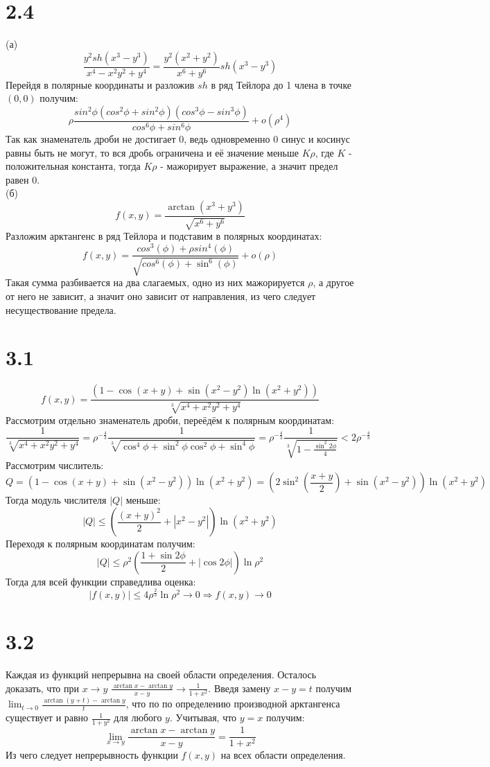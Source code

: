 \documentclass[12pt]{article}
\begin{document}
\section{2.4}
(а) 
$$\frac{y^2sh(x^3 - y^3)}{x^4 - x^2y^2 + y^4} = \frac{y^2(x^2 + y^2)}{x^6 + y^6} sh(x^3 - y^3)$$
Перейдя в полярные координаты и разложив $sh$ в ряд Тейлора до 1 члена в точке $(0, 0)$ получим:
$$
\rho \frac{sin^2{\phi}(cos^2{\phi} + sin^2{\phi})(cos^3{\phi} - sin^3{\phi})}{cos^6{\phi} + sin^6{\phi}} + o(\rho^4)
$$
Так как знаменатель дроби не достигает $0$, ведь одновременно $0$ синус и косинус равны быть не могут, то вся дробь ограничена и её значение меньше $K\rho$, 
где $K$ - положительная константа, тогда $K\rho$ - мажорирует выражение, а значит предел равен $0$.
\\(б)
$$f(x, y) = \frac{\arctan(x^3 + y^3)}{\sqrt{x^6 + y^6}}$$
Разложим арктангенс в ряд Тейлора и подставим в полярных координатах:
$$f(x, y) = \frac{cos^3(\phi) + \rho sin^4(\phi)}{\sqrt{cos^6(\phi) + \sin^6(\phi)}} + o(\rho)$$
Такая сумма разбивается на два слагаемых, одно из них мажорируется $\rho$, а другое от него не зависит, а значит оно зависит от направления, из чего следует несуществование предела.

\section{3.1}
$$f(x, y) = \frac{(1 - \cos(x+y) + \sin(x^2 - y^2)\ln(x^2 + y^2))}{\sqrt[3]{x^4 + x^2y^2 + y^4}}$$
Рассмотрим отдельно знаменатель дроби, переёдём к полярным координатам:
$$\frac{1}{\sqrt[3]{x^4 + x^2y^2 + y^4}} = 
\rho^{-\frac{4}{3}}\frac{1}{\sqrt[3]{\cos^4{\phi} + \sin^2{\phi}\cos^2{\phi} + \sin^4{\phi}}} = 
\rho^{-\frac{4}{3}}\frac{1}{\sqrt[3]{1 - \frac{\sin^2{2\phi}}{4}}} < 2\rho^{-\frac{4}{3}}$$
Рассмотрим числитель:
$$Q = (1 - \cos(x+y) + \sin(x^2 - y^2))\ln(x^2 + y^2) = 
(2\sin^2\left(\frac{x+y}{2}\right) + \sin(x^2 - y^2))\ln(x^2 + y^2)
$$
Тогда модуль числителя $|Q|$ меньше:
$$
|Q| \leq \left(\frac{(x+y)^2}{2} + |x^2 - y^2|\right)\ln(x^2 + y^2)
$$
Переходя к полярным координатам получим:
$$
|Q| \leq \rho^2\left(\frac{1 + \sin{2\phi}}{2} + |\cos{2\phi}|\right)\ln{\rho^2}
$$
Тогда для всей функции справедлива оценка:
$$
|f(x, y)| \leq 4\rho^{\frac{2}{3}}\ln{\rho^2} \to 0 \Rightarrow f(x, y) \to 0
$$

\section{3.2}
Каждая из функций непрерывна на своей области определения. Осталось доказать, что при $x \to y$ $\frac{\arctan x - \arctan y}{x - y} \to \frac{1}{1 + x^2}$.
Введя замену $x - y = t$ получим $\lim_{t \to 0}{\frac{\arctan(y + t) - \arctan y}{t}}$, что по по определению производной арктангенса существует и равно $\frac{1}{1 + y^2}$ для любого $y$.
Учитывая, что $y = x$ получим:
$$
\lim_{x \to y}{\frac{\arctan x - \arctan y}{x - y}} = \frac{1}{1 + x^2}
$$
Из чего следует непрерывность функции $f(x, y)$ на всех области определения.
\end{document}
